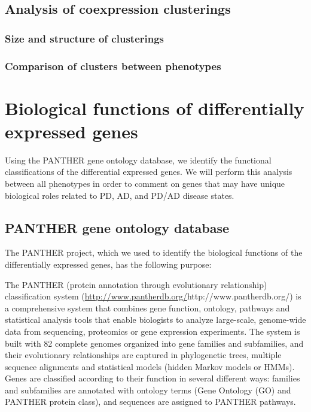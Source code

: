 \subsection{Analysis of coexpression clusterings}
\label{subsec:analys-coexpr-clust}

\subsubsection{Size and structure of clusterings}
\label{subsec:size-struct-clust}

\subsubsection{Comparison of clusters between phenotypes}
\label{subsec:comp-clust-betw}


\section{Biological functions of differentially expressed genes}
\label{sec:biol-funct-diff}

Using the PANTHER gene ontology database, we identify the functional classifications of the differential expressed genes. We will perform this analysis between all phenotypes in order to comment on genes that may have unique biological roles related to PD, AD, and PD/AD disease states.


\subsection{PANTHER gene ontology database}
\label{subsec:panth-gene-ontol}

The PANTHER project, which we used to identify the biological functions of the differentially expressed genes, has the following purpose\cite{PANTHER}:\\

\begin{blockquote}
  The PANTHER (protein annotation through evolutionary relationship) classification system (\url{http://www.pantherdb.org/}{http://www.pantherdb.org/}) is a comprehensive system that combines gene function, ontology, pathways and statistical analysis tools that enable biologists to analyze large-scale, genome-wide data from sequencing, proteomics or gene expression experiments. The system is built with 82 complete genomes organized into gene families and subfamilies, and their evolutionary relationships are captured in phylogenetic trees, multiple sequence alignments and statistical models (hidden Markov models or HMMs). Genes are classified according to their function in several different ways: families and subfamilies are annotated with ontology terms (Gene Ontology (GO) and PANTHER protein class), and sequences are assigned to PANTHER pathways.
\end{blockquote}

